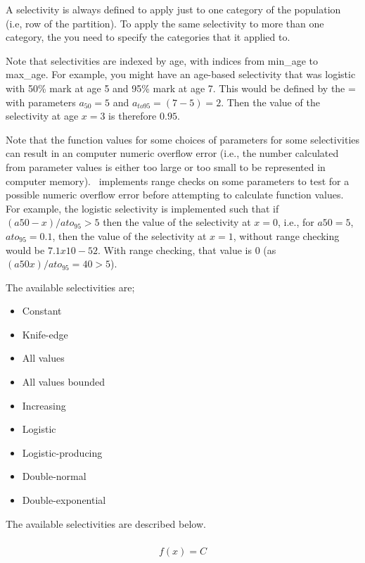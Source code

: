 A selectivity is always defined to apply just to one category of the population (i.e, row of the partition). To apply the same selectivity to more than one category, the you need to specify the categories that it applied to.

Note that selectivities are indexed by age, with indices from min\_age to max\_age. For example, you might have an age-based selectivity that was logistic with 50\% mark at age 5 and 95\% mark at age 7. This would be defined by the = with parameters $a_{50}=5$ and $a_{to95}=(7-5)=2$. Then the value of the selectivity at age $x=3$ is therefore $0.95$.

Note that the function values for some choices of parameters for some selectivities can result in an computer numeric overflow error (i.e., the number calculated from parameter values is either too large or too small to be represented in computer memory). \SPM\ implements range checks on some parameters to test for a possible numeric overflow error before attempting to calculate function values. For example, the logistic selectivity is implemented such that if $(a50-x)/ato_95 > 5$ then the value of the selectivity at $x=0$, i.e., for $a50=5$, $ato_95=0.1$, then the value of the selectivity at $x=1$, without range checking would be $7.1x10-52$. With range checking, that value is $0$ (as $(a50 x)/ato_95=40 > 5$).

The available selectivities are;

\begin{itemize}
  \item Constant
  \item Knife-edge
  \item All values
  \item All values bounded
  \item Increasing
  \item Logistic
  \item Logistic-producing
  \item Double-normal
  \item Double-exponential
\end{itemize}

The available selectivities are described below.

\subsubsection[Constant]{}

\begin{equation}
f(x)=C
\end{equation}


